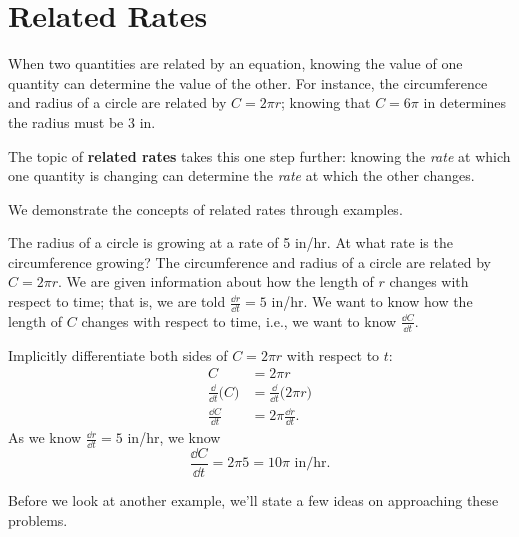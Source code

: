 \section{Related Rates}\label{sec:related_rates}

When two quantities are related by an equation, knowing the value of one quantity can determine the value of the other. For instance, the circumference and radius of a circle are related by $C=2\pi r$; knowing that $C = 6\pi$ in determines the radius must be 3 in.

The topic of \textbf{related rates} takes this one step further: knowing the \emph{rate} at which one quantity is changing can determine the \emph{rate} at which the other changes.



We demonstrate the concepts of related rates through examples.

\begin{example}\label{ex_rr1}
The radius of a circle is growing at a rate of 5 in/hr. At what rate is the circumference growing?
\solution
The circumference and radius of a circle are related by $C = 2\pi r$. We are given information about how the length of $r$ changes with respect to time; that is, we are told $\frac{\dd r}{\dd t} = 5$ in/hr. We want to know how the length of $C$ changes with respect to time, i.e., we want to know $\frac{\dd C}{\dd t}$. 

Implicitly differentiate both sides of $C = 2\pi r$ with respect to $t$:
\begin{align*}
C 	&= 2\pi r\\
\frac{\dd}{\dd t}\bigl(C\bigr) &= \frac{\dd}{\dd t}\bigl(2\pi r\bigr) \\
\frac{\dd C}{\dd t} &= 2\pi\frac{\dd r}{\dd t}.
\end{align*}
As we know $\frac{\dd r}{\dd t} = 5$ in/hr, we know
\[
 \frac{\dd C}{\dd t} = 2\pi 5 = 10\pi %
 \text{ in/hr.}
\]
\end{example}

Before we look at another example, we'll state a few ideas on approaching these problems.

